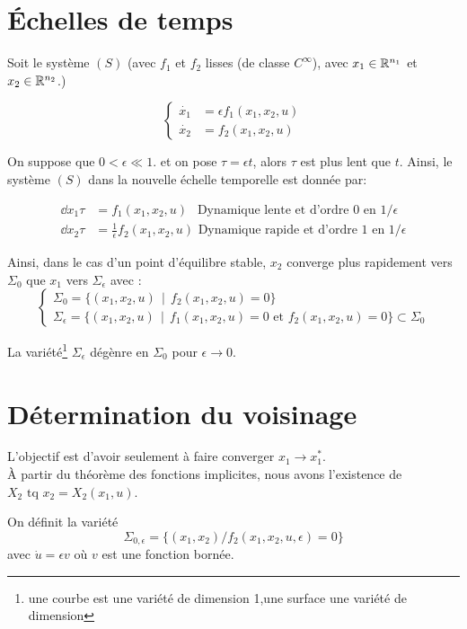 \documentclass[main.tex]{subfiles}
\begin{document}
\section{Échelles de temps}

Soit le système $(S)$  (avec $f_1$ et $f_2$ lisses (de classe $C^{\infty}$), avec $x_1\in\mathbb{R}^{n_1}$ et $x_2\in\mathbb{R}^{n_2}$.)

\[
  \begin{cases}
    \dot{x_1} & = \epsilon f_1(x_1,x_2,u) \\
    \dot{x_2} & = f_2(x_1,x_2,u)
  \end{cases}
\]

On suppose que $0 < \epsilon \ll 1$. et on pose $\tau = \epsilon t$, alors  $\tau$ est plus lent que $t$. Ainsi, le système $(S)$ dans la nouvelle échelle temporelle est donnée par:

\begin{align*}
\dd{x_1}{\tau} & = f_1(x_1,x_2,u) ~~\text{ Dynamique lente et d'ordre 0  en } 1/\epsilon \\
\dd{x_2}{\tau} & = \frac{1}{\epsilon} f_2(x_1,x_2,u) \text{ Dynamique rapide et d'ordre 1 en }1/\epsilon
\end{align*}
\begin{prop}
Ainsi, dans le cas d'un point d'équilibre stable, $x_2$ converge plus rapidement vers $\Sigma_0$ que $x_1$ vers $\Sigma_\epsilon$ avec :
\[
  \begin{cases}
    \Sigma_0 = \{(x_1,x_2,u) ~~|~~ f_2(x_1,x_2,u)=0\} \\
    \Sigma_\epsilon = \{(x_1,x_2,u) ~~|~~ f_1(x_1,x_2,u)=0 \text{ et }f_2(x_1,x_2,u)=0 \} \subset \Sigma_0
\end{cases}
\]
\end{prop}
\begin{rem}
  La variété\footnote{une courbe est une variété de dimension 1,une surface une variété de dimension} $\Sigma_\epsilon$ dégènre en $\Sigma_0$ pour $\epsilon \to 0$.
\end{rem}
\section{Détermination du voisinage}

L'objectif est d'avoir seulement à faire converger $x_1 \to x_1^*$.\\

À partir du théorème des fonctions implicites, nous avons l'existence de $X_2 \text{ tq } x_2 = X_2(x_1,u)$.

\begin{defin}
On définit la variété
\[ \Sigma_{0,\epsilon} = \{ (x_1,x_2) / f_2(x_1,x_2,u,\epsilon) = 0 \} \]
avec $\dot{u} = \epsilon v$ où $v$ est une fonction bornée.
\end{defin}
\end{document}
